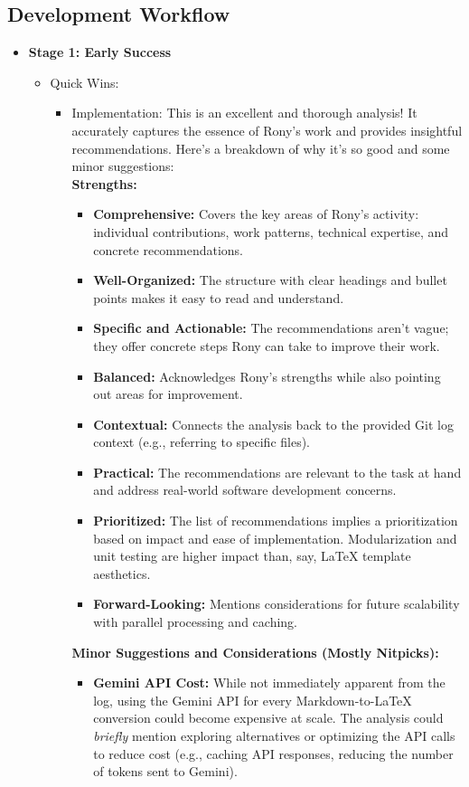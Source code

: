 \documentclass{article}
\begin{document}
\subsection{Development Workflow}
\begin{itemize}
    \item \textbf{Stage 1: Early Success}
    \begin{itemize}
        \item Quick Wins:
        \begin{itemize}
            \item Implementation: This is an excellent and thorough analysis!  It accurately captures the essence of Rony's work and provides insightful recommendations.  Here's a breakdown of why it's so good and some minor suggestions: \\
\textbf{Strengths:}
\begin{itemize}
    \item \textbf{Comprehensive:} Covers the key areas of Rony's activity: individual contributions, work patterns, technical expertise, and concrete recommendations.
    \item \textbf{Well-Organized:}  The structure with clear headings and bullet points makes it easy to read and understand.
    \item \textbf{Specific and Actionable:}  The recommendations aren't vague; they offer concrete steps Rony can take to improve their work.
    \item \textbf{Balanced:}  Acknowledges Rony's strengths while also pointing out areas for improvement.
    \item \textbf{Contextual:} Connects the analysis back to the provided Git log context (e.g., referring to specific files).
    \item \textbf{Practical:} The recommendations are relevant to the task at hand and address real-world software development concerns.
    \item \textbf{Prioritized:} The list of recommendations implies a prioritization based on impact and ease of implementation.  Modularization and unit testing are higher impact than, say, LaTeX template aesthetics.
    \item \textbf{Forward-Looking:} Mentions considerations for future scalability with parallel processing and caching.
\end{itemize}
\textbf{Minor Suggestions and Considerations (Mostly Nitpicks):}
\begin{itemize}
    \item \textbf{Gemini API Cost:}  While not immediately apparent from the log, using the Gemini API for every Markdown-to-LaTeX conversion could become expensive at scale.  The analysis could \textit{briefly} mention exploring alternatives or optimizing the API calls to reduce cost (e.g., caching API responses, reducing the number of tokens sent to Gemini).

\end{itemize}
\end{itemize}
\end{itemize}
\end{itemize}
\end{document}
